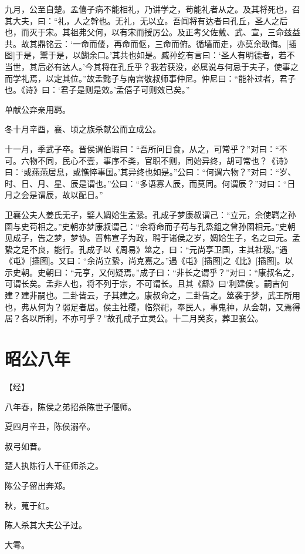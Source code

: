 \documentclass[a4paper,12pt,UTF8,twoside]{ctexbook}
\begin{document}
九月，公至自楚。孟僖子病不能相礼，乃讲学之，苟能礼者从之。及其将死也，召其大夫，曰：“礼，人之幹也。无礼，无以立。吾闻将有达者曰孔丘，圣人之后也，而灭于宋。其祖弗父何，以有宋而授厉公。及正考父佐戴、武、宣，三命兹益共。故其鼎铭云：‘一命而偻，再命而伛，三命而俯。循墙而走，亦莫余敢侮。[插图]于是，鬻于是，以餬余口。’其共也如是。臧孙纥有言曰：‘圣人有明德者，若不当世，其后必有达人。’今其将在孔丘乎？我若获没，必属说与何忌于夫子，使事之而学礼焉，以定其位。”故孟懿子与南宫敬叔师事仲尼。仲尼曰：“能补过者，君子也。《诗》曰：‘君子是则是效。’孟僖子可则效已矣。”

单献公弃亲用羁。

冬十月辛酉，襄、顷之族杀献公而立成公。

十一月，季武子卒。晋侯谓伯瑕曰：“吾所问日食，从之，可常乎？”对曰：“不可。六物不同，民心不壹，事序不类，官职不则，同始异终，胡可常也？《诗》曰：‘或燕燕居息，或憔悴事国。’其异终也如是。”公曰：“何谓六物？”对曰：“岁、时、日、月、星、辰是谓也。”公曰：“多语寡人辰，而莫同。何谓辰？”对曰：“日月之会是谓辰，故以配日。”

卫襄公夫人姜氏无子，嬖人婤姶生孟絷。孔成子梦康叔谓己：“立元，余使羁之孙圉与史苟相之。”史朝亦梦康叔谓己：“余将命而子苟与孔烝鉏之曾孙圉相元。”史朝见成子，告之梦，梦协。晋韩宣子为政，聘于诸侯之岁，婤姶生子，名之曰元。孟絷之足不良，能行。孔成子以《周易》筮之，曰：“元尚享卫国，主其社稷。”遇《屯》[插图]。又曰：“余尚立絷，尚克嘉之。”遇《屯》[插图]之《比》[插图]。以示史朝。史朝曰：“元亨，又何疑焉。”成子曰：“非长之谓乎？”对曰：“康叔名之，可谓长矣。孟非人也，将不列于宗，不可谓长。且其《繇》曰‘利建侯’。嗣吉何建？建非嗣也。二卦皆云，子其建之。康叔命之，二卦告之。筮袭于梦，武王所用也，弗从何为？弱足者居。侯主社稷，临祭祀，奉民人，事鬼神，从会朝，又焉得居？各以所利，不亦可乎？”故孔成子立灵公。十二月癸亥，葬卫襄公。

\chapter{昭公八年}




【经】

八年春，陈侯之弟招杀陈世子偃师。

夏四月辛丑，陈侯溺卒。

叔弓如晋。

楚人执陈行人干征师杀之。

陈公子留出奔郑。

秋，蒐于红。

陈人杀其大夫公子过。

大雩。
\end{document}
